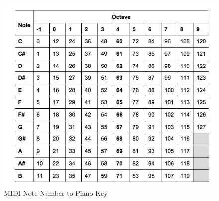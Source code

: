 \documentclass[11pt, a4paper]{report}
\begin{document}
\begin{figure}[H]
\hspace*{-2cm}    
    \centering
    \includegraphics[width=.75\textwidth]{midi_notechart.jpg}
    \caption{MIDI Note Number to Piano Key}
    \label{fig:Piano}
\end{figure}
\end{document}
